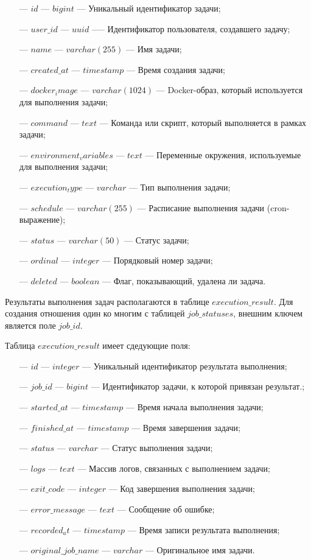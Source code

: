 \begin{itemize}
  \item[---]$id$ --- $bigint$ — Уникальный идентификатор задачи;
  \item[---]$user\_id$ --- $uuid$ —-- Идентификатор пользователя, создавшего задачу;
  \item[---]$name$ --- $varchar(255)$ — Имя задачи;
  \item[---]$created\_at$ --- $timestamp$ — Время создания задачи;
  \item[---]$docker_image$ --- $varchar(1024)$ — Docker-образ, который используется для выполнения задачи;
  \item[---]$command$ --- $text$ — Команда или скрипт, который выполняется в рамках задачи;
  \item[---]$environment_variables$ --- $text$ — Переменные окружения, используемые для выполнения задачи;
  \item[---]$execution_type$ --- $varchar$ — Тип выполнения задачи;
  \item[---]$schedule$ --- $varchar(255)$ — Расписание выполнения задачи (cron-выражение);
  \item[---]$status$ --- $varchar(50)$ — Статус задачи;
  \item[---]$ordinal$ --- $integer$ — Порядковый номер задачи;
  \item[---]$deleted$ --- $boolean$ — Флаг, показывающий, удалена ли задача.
\end{itemize}

Результаты выполнения задач располагаются в таблице $execution\_result$. Для создания отношения один ко многим с таблицей $job\_statuses$, внешним ключем является поле $job\_id$.

Таблица $execution\_result$ имеет сдедующие поля:

\begin{itemize}
  \item[---]$id$ --- $integer$ — Уникальный идентификатор результата выполнения;
  \item[---]$job\_id$ --- $bigint$ — Идентификатор задачи, к которой привязан результат.;
  \item[---]$started\_at$ --- $timestamp$ — Время начала выполнения задачи;
  \item[---]$finished\_at$ --- $timestamp$ — Время завершения задачи;
  \item[---]$status$ --- $varchar$ — Статус выполнения задачи;
  \item[---]$logs$ --- $text$ — Массив логов, связанных с выполнением задачи;
  \item[---]$exit\_code$ --- $integer$ — Код завершения выполнения задачи;
  \item[---]$error\_message$ --- $text$ — Сообщение об ошибке;
  \item[---]$recorded_at$ --- $timestamp$ — Время записи результата выполнения;
  \item[---]$original\_job\_name$ --- $varchar$ — Оригинальное имя задачи.
\end{itemize}

